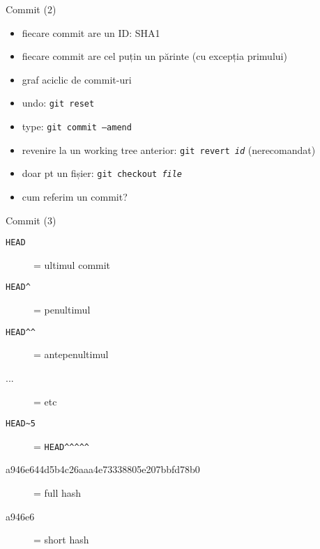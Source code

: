 \documentclass{beamer}
\begin{document}
\begin{frame}{Commit (2)}
  \begin{itemize}
    \item fiecare commit are un ID: SHA1
    \item fiecare commit are cel puțin un părinte (cu excepția primului)
    \item graf aciclic de commit-uri
    \pause
    \item undo: \texttt{git reset}
    \item type: \texttt{git commit --amend}
    \item revenire la un working tree anterior: \texttt{git revert \textit{id}}
    (nerecomandat)
    \item doar pt un fișier: \texttt{git checkout \textit{file}}
    \pause
    \item cum referim un commit?
  \end{itemize}
\end{frame}

\begin{frame}{Commit (3)}
  \begin{description}
    \item[\texttt{HEAD}] = ultimul commit
    \item[\texttt{HEAD\textasciicircum}] = penultimul
    \item[\texttt{HEAD\textasciicircum\textasciicircum}] = antepenultimul
    \item[...] = etc
    \pause
    \item[\texttt{HEAD\textasciitilde5}] = \texttt{HEAD\textasciicircum\textasciicircum\textasciicircum\textasciicircum\textasciicircum}
    \pause
    \item[a946e644d5b4c26aaa4e73338805e207bbfd78b0] = full hash
    \item[a946e6] = short hash
  \end{description}
\end{frame}
\end{document}
